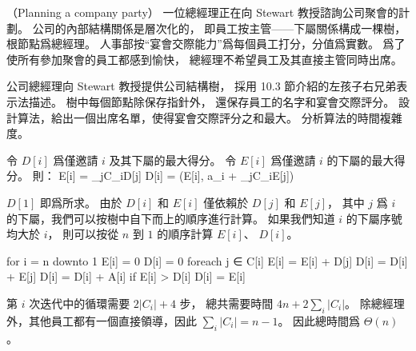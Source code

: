 \startPROBLEM
（Planning a company party）
一位總經理正在向 Stewart 教授諮詢公司聚會的計劃。
公司的內部結構關係是層次化的，
即員工按主管——下屬關係構成一棵樹，根節點爲總經理。
人事部按“宴會交際能力”爲每個員工打分，分值爲實數。
爲了使所有參加聚會的員工都感到愉快，
總經理不希望員工及其直接主管同時出席。

公司總經理向 Stewart 教授提供公司結構樹，
採用 10.3 節介紹的左孩子右兄弟表示法描述。
樹中每個節點除保存指針外，
還保存員工的名字和宴會交際評分。
設計算法，給出一個出席名單，使得宴會交際評分之和最大。
分析算法的時間複雜度。
\stopPROBLEM

\startANSWER
令 $D[i]$ 爲僅邀請 $i$ 及其下屬的最大得分。
令 $E[i]$ 爲僅邀請 $i$ 的下屬的最大得分。
則：
\startformula\startmathalignment
\NC E[i] \NC = \sum_{j\in C_i}D[j] \NR
\NC D[i] \NC = \max(E[i], a_i + \sum_{j\in C_i}E[j]) \NR
\stopmathalignment\stopformula

$D[1]$ 即爲所求。
由於 $D[i]$ 和 $E[i]$ 僅依賴於 $D[j]$ 和 $E[j]$，
其中 $j$ 爲 $i$ 的下屬，我們可以按樹中自下而上的順序進行計算。
如果我們知道 $i$ 的下屬序號均大於 $i$，
則可以按從 $n$ 到 $1$ 的順序計算 $E[i]$、 $D[i]$。

\startCLRSCODE
for i = n downto 1
	E[i] = 0
	D[i] = 0
	foreach j ∈ C[i]
		E[i] = E[i] + D[j]
		D[i] = D[i] + E[j]
	D[i] = D[i] + A[i]
	if E[i] > D[i]
		D[i] = E[i]
\stopCLRSCODE

第 $i$ 次迭代中的循環需要 $2|C_i|+4$ 步，
總共需要時間 $4n + 2\sum_i|C_i|$。
除總經理外，其他員工都有一個直接領導，因此 $\sum_i|C_i|=n-1$。
因此總時間爲 $\Theta(n)$。
\stopANSWER
